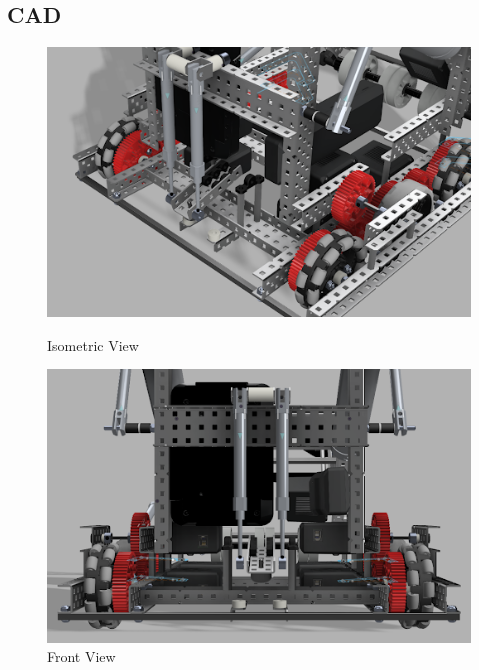 \subsection*{CAD}
\begin{figure}[h!] %
    \begin{minipage}{.55\textwidth}
        \centering
        \includegraphics[width=1\linewidth]{images/Iso-Clamp-V1.png}
        \caption{Isometric View}
        \label{fig:iso}
    \end{minipage}
    \begin{minipage}{.55\textwidth}
        \centering
        \includegraphics[width=1\linewidth]{images/Front-Clamp-V1.png}
        \caption{Front View}
        \label{fig:front}
    \end{minipage}
    \begin{minipage}{.55\textwidth}
        \centering

\end{minipage}
\end{figure}
